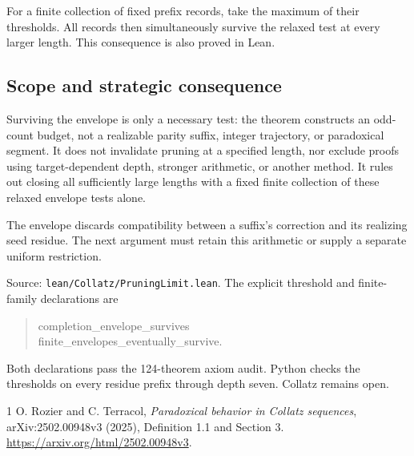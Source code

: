 \documentclass[11pt]{article}
\begin{document}
For a finite collection of fixed prefix records, take the maximum of their thresholds. All records then simultaneously survive the relaxed test at every larger length. This consequence is also proved in Lean.

\subsection*{Scope and strategic consequence}
Surviving the envelope is only a necessary test: the theorem constructs an odd-count budget, not a realizable parity suffix, integer trajectory, or paradoxical segment. It does not invalidate pruning at a specified length, nor exclude proofs using target-dependent depth, stronger arithmetic, or another method. It rules out closing all sufficiently large lengths with a fixed finite collection of these relaxed envelope tests alone.

The envelope discards compatibility between a suffix's correction and its realizing seed residue. The next argument must retain this arithmetic or supply a separate uniform restriction.

Source: \texttt{lean/Collatz/PruningLimit.lean}. The explicit threshold and finite-family declarations are
\begin{quote}\small\ttfamily
completion\_envelope\_survives\\
finite\_envelopes\_eventually\_survive.
\end{quote}
Both declarations pass the 124-theorem axiom audit. Python checks the thresholds on every residue prefix through depth seven. Collatz remains open.

\begin{thebibliography}{1}
 O. Rozier and C. Terracol, \emph{Paradoxical behavior in Collatz sequences}, arXiv:2502.00948v3 (2025), Definition 1.1 and Section 3. \url{https://arxiv.org/html/2502.00948v3}.
\end{thebibliography}
\end{document}
